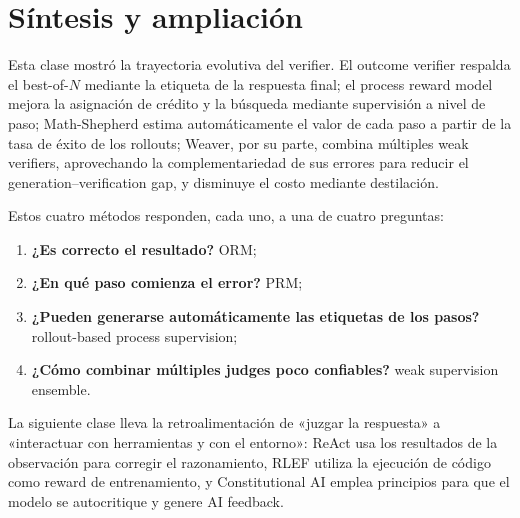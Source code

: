 \documentclass[a4paper]{article}
\begin{document}
\section{Síntesis y ampliación}

Esta clase mostró la trayectoria evolutiva del verifier. El outcome verifier respalda el best-of-$N$ mediante la etiqueta de la respuesta final; el process reward model mejora la asignación de crédito y la búsqueda mediante supervisión a nivel de paso; Math-Shepherd estima automáticamente el valor de cada paso a partir de la tasa de éxito de los rollouts; Weaver, por su parte, combina múltiples weak verifiers, aprovechando la complementariedad de sus errores para reducir el generation--verification gap, y disminuye el costo mediante destilación.

Estos cuatro métodos responden, cada uno, a una de cuatro preguntas:

\begin{enumerate}
    \item \textbf{¿Es correcto el resultado?} ORM;
    \item \textbf{¿En qué paso comienza el error?} PRM;
    \item \textbf{¿Pueden generarse automáticamente las etiquetas de los pasos?} rollout-based process supervision;
    \item \textbf{¿Cómo combinar múltiples judges poco confiables?} weak supervision ensemble.
\end{enumerate}

La siguiente clase lleva la retroalimentación de «juzgar la respuesta» a «interactuar con herramientas y con el entorno»: ReAct usa los resultados de la observación para corregir el razonamiento, RLEF utiliza la ejecución de código como reward de entrenamiento, y Constitutional AI emplea principios para que el modelo se autocritique y genere AI feedback.
\end{document}
